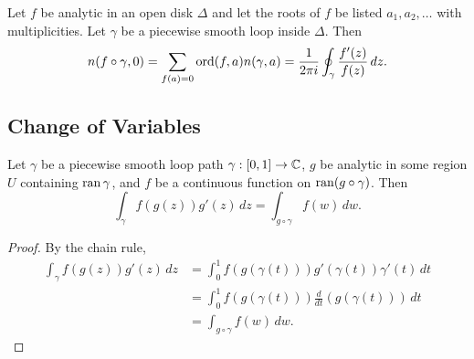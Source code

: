 \begin{theorem}
    Let $f$ be analytic in an open disk $\Delta$ and let 
    the roots of $f$ be listed $a_1, a_2, \ldots$ with
    multiplicities.
    Let $\gamma$ be a piecewise smooth loop inside $\Delta$.
    Then
    \[
        n(f \circ \gamma, 0)
        = \sum_{f(a) = 0} \operatorname{ord} (f, a) n(\gamma, a)
        = \frac{1}{2\pi i} \oint_{\gamma} \frac{f'(z)}{f(z)} \,
        dz.
    \]
\end{theorem}

\subsection{Change of Variables}

\begin{theorem}
    Let $\gamma$ be a piecewise smooth loop path $\gamma: [0,1]
    \to \operatorname{\mathbb{C}}$, $g$ be analytic in some region $U$ containing
    $\operatorname{ran} \gamma$, and
    $f$ be a continuous function on $\operatorname{ran} (g \circ \gamma)$.
    Then
    \[
        \int_{\gamma} f(g(z)) g'(z) \, dz = 
        \int_{g \circ \gamma} f(w) \, dw.
    \]
\end{theorem}

\begin{proof}
    By the chain rule,
    \begin{align*}
        \int_{\gamma} f(g(z)) g'(z) \, dz &= 
        \int_0^1 f(g(\gamma(t))) g'(\gamma(t)) \gamma'(t) \, dt\\
        &= \int_0^1 f(g(\gamma(t))) \frac{d}{dt} (g(\gamma(t)))
        \, dt \\
        &= \int_{g \circ \gamma} f(w) \, dw.
    \end{align*}
\end{proof}






